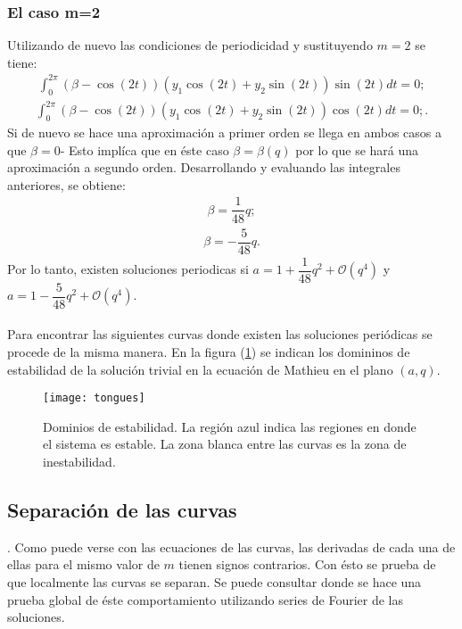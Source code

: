 \subsubsection{El caso m=2}
Utilizando de nuevo las condiciones de periodicidad y sustituyendo $m=2$ se tiene:
\begin{eqnarray*}
\int_{0}^{2\pi} (\beta-\cos(2t))(y_{1}\cos(2t)+y_{2}\sin(2t))\sin(2t) dt=0;
\end{eqnarray*}
\begin{eqnarray*}
\int_{0}^{2\pi} (\beta-\cos(2t))(y_{1}\cos(2t)+y_{2}\sin(2t))\cos(2t) dt=0;.
\end{eqnarray*}
Si de nuevo se hace una aproximación a primer orden se llega en ambos casos a que $\beta =0$- Esto implíca que en éste caso $\beta = \beta(q)$ por lo que se hará una aproximación a segundo orden. Desarrollando y evaluando las integrales anteriores, se obtiene:
\begin{eqnarray}
\beta = \dfrac{1}{48}q ;
\end{eqnarray}
\begin{eqnarray}
\beta = -\dfrac{5}{48}q.
\end{eqnarray}
Por lo tanto, existen soluciones periodicas si $a=1 + \dfrac{1}{48}q^{2} + \mathcal{O}(q^{4})$ y $a=1 - \dfrac{5}{48}q^{2} + \mathcal{O}(q^{4})$.
\\
\\
Para encontrar las siguientes curvas donde existen las soluciones periódicas se procede de la misma manera. En la figura (\ref{tongues}) se indican los domininos de estabilidad de la solución trivial en la ecuación de Mathieu en el plano $(a,q)$.
\begin{figure}[h]
  \centering
    \texttt{[image: tongues]}      %
  \caption{Dominios de estabilidad. La región azul indica las regiones en donde el sistema es estable. La zona blanca entre las curvas es la zona de inestabilidad.}            %
  \label{tongues}                            %
\end{figure}
\subsection{Separación de las curvas}.
Como puede verse con las ecuaciones de las curvas, las derivadas de cada una de ellas para el mismo valor de $m$ tienen signos contrarios. Con ésto se prueba de que localmente las curvas se separan. Se puede consultar \citep{ize} donde se hace una prueba global de éste comportamiento utilizando series de Fourier de las soluciones.
